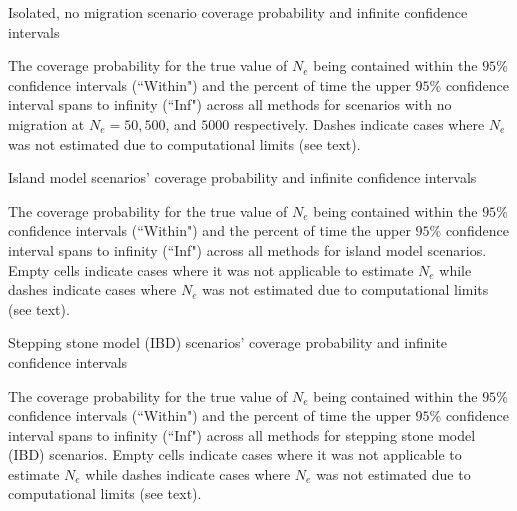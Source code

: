 \begin{table}[h]
\centering \small
\caption[Isolated, no migration scenario coverage probability and infinite confidence intervals]{Isolated, no migration scenario coverage probability and infinite confidence intervals}
\label{tab:ne6}

\bigskip{}
{\footnotesize The coverage probability for the true value of $N_e$ being contained within the $95\%$ confidence intervals (``Within") and the percent of time the upper $95\%$ confidence interval spans to infinity (``Inf") across all methods for scenarios with no migration at $N_e = 50, 500$, and $5000$ respectively. Dashes indicate cases where $N_e$ was not estimated due to computational limits (see text).}
\end{table}


\begin{table}[h]
\centering \small
\caption[Island model scenarios' coverage probability and infinite confidence intervals]{Island model scenarios' coverage probability and infinite confidence intervals}
\label{tab:ne7}

\bigskip{}
{\footnotesize The coverage probability for the true value of $N_e$ being contained within the $95\%$ confidence intervals (``Within") and the percent of time the upper $95\%$ confidence interval spans to infinity (``Inf") across all methods for island model scenarios. Empty cells indicate cases where it was not applicable to estimate $N_e$ while dashes indicate cases where $N_e$ was not estimated due to computational limits (see text).}
\end{table}


\begin{table}[h]
\centering \small
\caption[Stepping stone model (IBD) scenarios' coverage probability and infinite confidence intervals]{Stepping stone model (IBD) scenarios' coverage probability and infinite confidence intervals}
\label{tab:ne8}

\bigskip{}
{\footnotesize The coverage probability for the true value of $N_e$ being contained within the $95\%$ confidence intervals (``Within") and the percent of time the upper $95\%$ confidence interval spans to infinity (``Inf") across all methods for stepping stone model (IBD) scenarios. Empty cells indicate cases where it was not applicable to estimate $N_e$ while dashes indicate cases where $N_e$ was not estimated due to computational limits (see text).}
\end{table}









